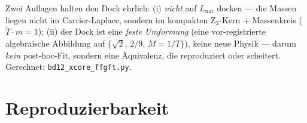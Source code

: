 Zwei Auflagen halten den Dock ehrlich: (i) \emph{nicht} auf $L_{\text{nat}}$ docken --- die Massen
liegen nicht im Carrier-Laplace, sondern im kompakten Z$_3$-Kern $+$ Massenkreis ($\tilde T\cdot m=1$);
(ii) der Dock ist eine \emph{feste Umformung} (eine vor-registrierte algebraische Abbildung auf
$\{\sqrt2,\,2/9,\,M=1/T\}$), keine neue Physik --- darum \emph{kein} post-hoc-Fit, sondern eine
Äquivalenz, die reproduziert oder scheitert. Gerechnet: \texttt{bd12\_xcore\_ffgft.py}.

\section{Reproduzierbarkeit}\label{sec:repro}
